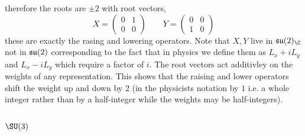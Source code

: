 \documentclass[12pt]{article}
\begin{document}
therefore the roots are $\pm 2$ with root vectors,
\[ X = \begin{pmatrix}
0 & 1
\\
0 & 0 
\end{pmatrix} 
\quad \quad 
Y = \begin{pmatrix}
0 & 0 
\\
1 & 0
\end{pmatrix} \]
these are exactly the rasing and lowering operators. Note that $X,Y$ live in $\su(2)_{\C}$ not in $\mathfrak{su}(2)$ corresponding to the fact that in physics we define them as $L_x + i L_y$ and $L_x - i L_y$ which require a factor of $i$. The root vectors act additivley on the weights of any representation. This shows that the raising and lower operators shift the weight up and down by $2$ (in the physicists notation by $1$ i.e. a whole integer rather than by a half-integer while the weights may be half-integers).
\subsection{$\SU(3)$}
\end{document}
